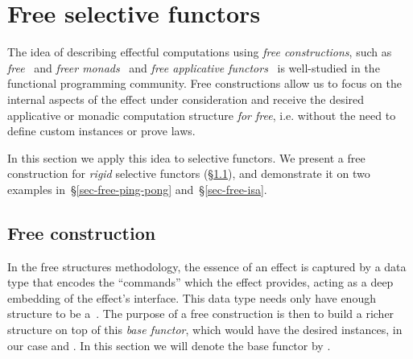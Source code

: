 \section{Free selective functors}\label{sec-free}

The idea of describing effectful computations using \emph{free constructions},
such as \emph{free}~\cite{swierstra2008data} and \emph{freer
monads}~\cite{kiselyov2015freer} and \emph{free applicative
functors}~\cite{free-applicatives} is well-studied in the functional programming
community. Free constructions allow us to focus on the internal aspects of the
effect under consideration and receive the desired applicative or monadic
computation structure \emph{for free}, i.e. without the need to define custom
instances or prove laws.

In this section we apply this idea to selective functors. We present a free
construction for \emph{rigid} selective functors
(\S\ref{sec-free-construction}), and demonstrate it on two examples
in~\S\ref{sec-free-ping-pong} and~\S\ref{sec-free-isa}.

\subsection{Free construction}\label{sec-free-construction}

In the free structures methodology, the essence of an effect is captured by a
data type that encodes the ``commands'' which the effect provides, acting as a
deep embedding of the effect's interface. This data type needs only have enough
structure to be a~. The purpose of a free construction is then to
build a richer structure on top of this \emph{base functor}, which would have
the desired instances, in our case  and . In this
section we will denote the base functor by .

